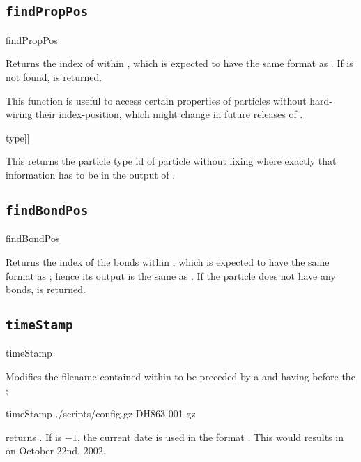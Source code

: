 \subsection{\texttt{findPropPos}}
\begin{essyntax}
  findPropPos  
\end{essyntax}
Returns the index of  within
, which is expected to have the same
format as . If  is not
found,  is returned.

This function is useful to access certain properties of particles
without hard-wiring their index-position, which might change in future
releases of .

\begin{tclcode}
[lindex [part $i] [findPropPos [part $i] type]]
\end{tclcode}
This returns the particle type id of particle  without fixing
where exactly that information has to be in the output of 
\codebox{[part \$i]}.

\subsection{\texttt{findBondPos}}
\begin{essyntax}
  findBondPos 
\end{essyntax}

Returns the index of the bonds within ,
which is expected to have the same format as ; hence its output is the same as
. If the
particle does not have any bonds,  is returned.

\subsection{\texttt{timeStamp}}
\begin{essyntax}
  timeStamp    
\end{essyntax}
Modifies the filename contained within  to be preceded by a
 and having  before the ; \eg
\begin{tclcode}
  timeStamp ./scripts/config.gz DH863 001 gz
\end{tclcode}
returns .  If  is $-1$,
the current date is used in the format . This would
results in  on October 22nd,
2002.

